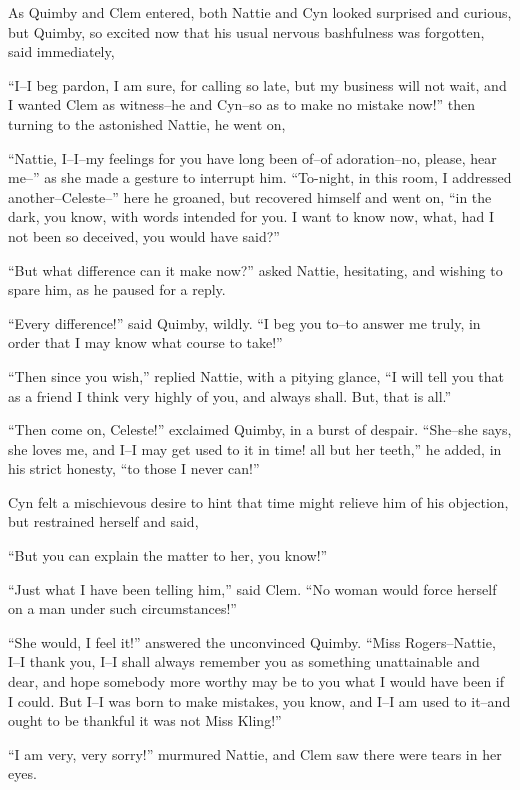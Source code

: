 As Quimby and Clem entered, both Nattie and Cyn looked surprised and
curious, but Quimby, so excited now that his usual nervous bashfulness
was forgotten, said immediately,

``I--I beg pardon, I am sure, for calling so late, but my business will
not wait, and I wanted Clem as witness--he and Cyn--so as to make no
mistake now!'' then turning to the astonished Nattie, he went on,

``Nattie, I--I--my feelings for you have long been of--of adoration--no,
please, hear me--'' as she made a gesture to interrupt him. ``To-night, in
this room, I addressed another--Celeste--'' here he groaned, but
recovered himself and went on, ``in the dark, you know, with words
intended for you. I want to know now, what, had I not been so deceived,
you would have said?''

``But what difference can it make now?'' asked Nattie, hesitating, and
wishing to spare him, as he paused for a reply.

``Every difference!'' said Quimby, wildly. ``I beg you to--to answer me
truly, in order that I may know what course to take!''

``Then since you wish,'' replied Nattie, with a pitying glance, ``I will
tell you that as a friend I think very highly of you, and always shall.
But, that is all.''

``Then come on, Celeste!'' exclaimed Quimby, in a burst of despair.
``She--she says, she loves me, and I--I may get used to it in time! all
but her teeth,'' he added, in his strict honesty, ``to those I never can!''

Cyn felt a mischievous desire to hint that time might relieve him of his
objection, but restrained herself and said,

``But you can explain the matter to her, you know!''

``Just what I have been telling him,'' said Clem. ``No woman would force
herself on a man under such circumstances!''

``She would, I feel it!'' answered the unconvinced Quimby. ``Miss
Rogers--Nattie, I--I thank you, I--I shall always remember you as
something unattainable and dear, and hope somebody more worthy may be to
you what I would have been if I could. But I--I was born to make
mistakes, you know, and I--I am used to it--and ought to be thankful it
was not Miss Kling!''

``I am very, very sorry!'' murmured Nattie, and Clem saw there were tears
in her eyes.

